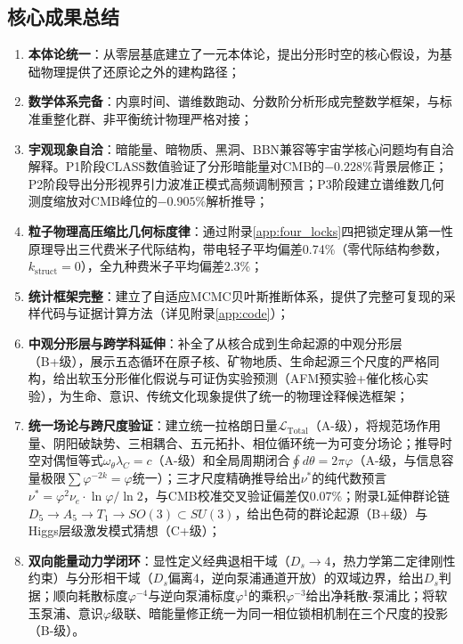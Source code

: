 \documentclass[12pt,a4paper,twocolumn]{article}
\renewcommand{\phi}{\varphi}
\begin{document}
\subsection{核心成果总结}
\begin{enumerate}
\item \textbf{本体论统一}：从零层基底建立了一元本体论，提出分形时空的核心假设，为基础物理提供了还原论之外的建构路径；
\item \textbf{数学体系完备}：内禀时间、谱维数跑动、分数阶分析形成完整数学框架，与标准重整化群、非平衡统计物理严格对接；
\item \textbf{宇观现象自洽}：暗能量、暗物质、黑洞、BBN兼容等宇宙学核心问题均有自洽解释。P1阶段CLASS数值验证了分形暗能量对CMB的$-0.228\%$背景层修正；P2阶段导出分形视界引力波准正模式高频调制预言；P3阶段建立谱维数几何测度缩放对CMB峰位的$-0.905\%$解析推导；
\item \textbf{粒子物理高压缩比几何标度律}：通过附录\ref{app:four_locks}四把锁定理从第一性原理导出三代费米子代际结构，带电轻子平均偏差0.74\%（零代际结构参数，$k_{\text{struct}}=0$），全九种费米子平均偏差2.3\%；
\item \textbf{统计框架完整}：建立了自适应MCMC贝叶斯推断体系，提供了完整可复现的采样代码与证据计算方法（详见附录\ref{app:code}）；
\item \textbf{中观分形层与跨学科延伸}：补全了从核合成到生命起源的中观分形层（B+级），展示五态循环在原子核、矿物地质、生命起源三个尺度的严格同构，给出软玉分形催化假说与可证伪实验预测（AFM预实验+催化核心实验），为生命、意识、传统文化现象提供了统一的物理诠释候选框架；
\item \textbf{统一场论与跨尺度验证}：建立统一拉格朗日量$\mathcal{L}_{\text{Total}}$（A-级），将规范场作用量、阴阳破缺势、三相耦合、五元拓扑、相位循环统一为可变分场论；推导时空对偶恒等式$\omega_\theta\lambda_C=c$（A-级）和全局周期闭合$\oint d\theta=2\pi\phi$（A-级，与信息容量极限$\sum\phi^{-2k}=\phi$统一）；三才尺度精确推导给出$\nu^*$的纯代数预言$\nu^*=\phi^2\nu_e\cdot\ln\phi/\ln 2$，与CMB校准交叉验证偏差仅0.07\%；附录L延伸群论链$D_5\to A_5\to T_1\to SO(3)\subset SU(3)$，给出色荷的群论起源（B+级）与Higgs层级激发模式猜想（C+级）；
\item \textbf{双向能量动力学闭环}：显性定义经典退相干域（$D_s\to 4$，热力学第二定律刚性约束）与分形相干域（$D_s$偏离4，逆向泵浦通道开放）的双域边界，给出$D_s$判据；顺向耗散标度$\phi^{-4}$与逆向泵浦标度$\phi^{1}$的乘积$\phi^{-3}$给出净耗散-泵浦比；将软玉泵浦、意识$\phi$级联、暗能量修正统一为同一相位锁相机制在三个尺度的投影（B-级）。
\end{enumerate}
\end{document}
